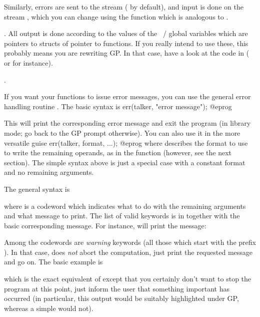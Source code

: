 Similarly, errors are sent to the stream  (
by default), and input is done on the stream , which you can change
using the function  which is analogous to .

. All output is done according to the values
of the ~/  global variables which are pointers to
structs of pointer to functions. If you really intend to use these, this
probably means you are rewriting GP. In that case, have a look at the code in
 ( or  for instance).

.

\noindent
If you want your functions to issue error messages, you can use the general
error handling routine . The basic syntax is
%
\bprog
  err(talker, "error message");
@eprog

\noindent
This will print the corresponding error message and exit the program (in
library mode; go back to the GP prompt otherwise).\label{se:err} You can
also use it in the more versatile guise
\bprog
  err(talker, format, ...);
@eprog\noindent
where  describes the format to use to write the remaining
operands, as in the  function (however, see the next section).
The simple syntax above is just a special case with a constant format and no
remaining arguments.

\noindent
The general syntax is


\noindent where  is a codeword which indicates what to do with
the remaining arguments and what message to print. The list of valid keywords
is in  together with the basic corresponding
message. For instance,  will print the message:


\noindent
Among the codewords are \emph{warning} keywords (all those which start with
the prefix ). In that case,  does \emph{not} abort the
computation, just print the requested message and go on. The basic example is


\noindent which is the exact equivalent of  except that
you certainly don't want to stop the program at this point, just inform the
user that something important has occurred (in particular, this output would be
suitably highlighted under GP, whereas a simple  would not).

